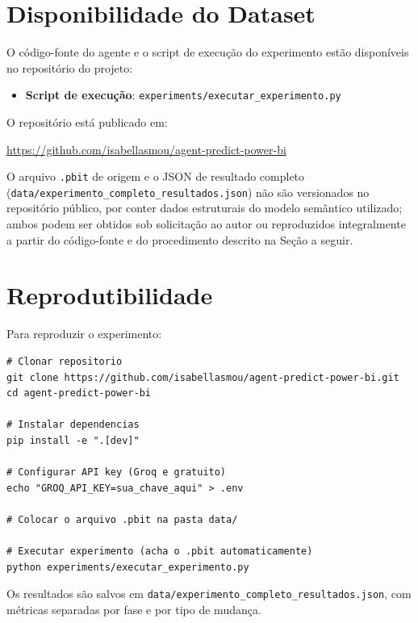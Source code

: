 \section{Disponibilidade do Dataset}
\label{sec:disponibilidade-dataset}

O código-fonte do agente e o script de execução do experimento estão disponíveis no repositório do projeto:

\begin{itemize}
    \item \textbf{Script de execução}: \texttt{experiments/executar\_experimento.py}
\end{itemize}

O repositório está publicado em:

\url{https://github.com/isabellasmou/agent-predict-power-bi}

O arquivo \texttt{.pbit} de origem e o JSON de resultado completo (\texttt{data/experimento\_completo\_resultados.json}) não são versionados no repositório público, por conter dados estruturais do modelo semântico utilizado; ambos podem ser obtidos sob solicitação ao autor ou reproduzidos integralmente a partir do código-fonte e do procedimento descrito na Seção a seguir.

\section{Reprodutibilidade}

Para reproduzir o experimento:

\begin{verbatim}
# Clonar repositorio
git clone https://github.com/isabellasmou/agent-predict-power-bi.git
cd agent-predict-power-bi

# Instalar dependencias
pip install -e ".[dev]"

# Configurar API key (Groq e gratuito)
echo "GROQ_API_KEY=sua_chave_aqui" > .env

# Colocar o arquivo .pbit na pasta data/

# Executar experimento (acha o .pbit automaticamente)
python experiments/executar_experimento.py
\end{verbatim}

Os resultados são salvos em \texttt{data/experimento\_completo\_resultados.json}, com métricas separadas por fase e por tipo de mudança.